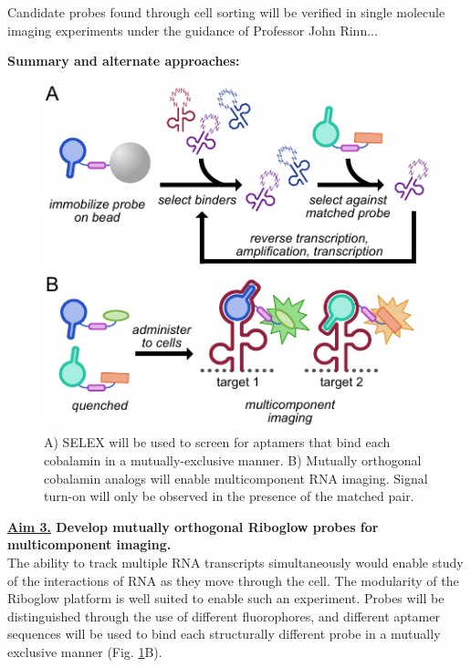 Candidate probes found through cell sorting will be verified in single molecule imaging experiments under the guidance of Professor John Rinn... 

\textbf{Summary and alternate approaches:}

\begin{figure}
\begin{centering}
\includegraphics[width=\textwidth]{figures/aim3v2.pdf}
\end{centering}
\footnotesize
\caption{\label{figure:aim3}
A) SELEX will be used to screen for aptamers that bind each cobalamin in a mutually-exclusive manner. B) Mutually orthogonal cobalamin analogs will enable multicomponent RNA imaging. Signal turn-on will only be observed in the presence of the matched pair.
}
\end{figure}

\textbf{\underline{Aim 3.} Develop mutually orthogonal Riboglow probes for multicomponent imaging.}\\
The ability to track multiple RNA transcripts simultaneously would enable study of the interactions of RNA as they move through the cell.  The modularity of the Riboglow platform is well suited to enable such an experiment. Probes will be distinguished through the use of different fluorophores, and different aptamer sequences will be used to bind each structurally different probe in a mutually exclusive manner (Fig. \ref{figure:aim3}B). 


